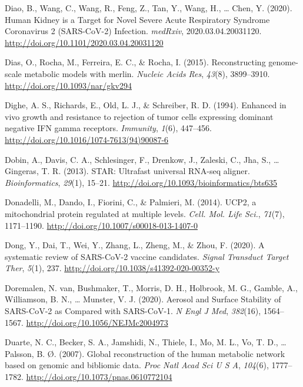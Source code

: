 \documentclass[12pt,twoside,openany,\mydriver]{thesis}  %
\begin{document}
\leavevmode\hypertarget{ref-diao_human_2020}{}%
Diao, B., Wang, C., Wang, R., Feng, Z., Tan, Y., Wang, H., \ldots{} Chen, Y. (2020). Human Kidney is a Target for Novel Severe Acute Respiratory Syndrome Coronavirus 2 (SARS-CoV-2) Infection. \emph{medRxiv}, 2020.03.04.20031120. \url{http://doi.org/10.1101/2020.03.04.20031120}

\leavevmode\hypertarget{ref-dias_reconstructing_2015}{}%
Dias, O., Rocha, M., Ferreira, E. C., \& Rocha, I. (2015). Reconstructing genome-scale metabolic models with merlin. \emph{Nucleic Acids Res}, \emph{43}(8), 3899--3910. \url{http://doi.org/10.1093/nar/gkv294}

\leavevmode\hypertarget{ref-dighe_enhanced_1994}{}%
Dighe, A. S., Richards, E., Old, L. J., \& Schreiber, R. D. (1994). Enhanced in vivo growth and resistance to rejection of tumor cells expressing dominant negative IFN gamma receptors. \emph{Immunity}, \emph{1}(6), 447--456. \url{http://doi.org/10.1016/1074-7613(94)90087-6}

\leavevmode\hypertarget{ref-dobin_star_2013}{}%
Dobin, A., Davis, C. A., Schlesinger, F., Drenkow, J., Zaleski, C., Jha, S., \ldots{} Gingeras, T. R. (2013). STAR: Ultrafast universal RNA-seq aligner. \emph{Bioinformatics}, \emph{29}(1), 15--21. \url{http://doi.org/10.1093/bioinformatics/bts635}

\leavevmode\hypertarget{ref-donadelli_ucp2_2014}{}%
Donadelli, M., Dando, I., Fiorini, C., \& Palmieri, M. (2014). UCP2, a mitochondrial protein regulated at multiple levels. \emph{Cell. Mol. Life Sci.}, \emph{71}(7), 1171--1190. \url{http://doi.org/10.1007/s00018-013-1407-0}

\leavevmode\hypertarget{ref-dong_systematic_2020}{}%
Dong, Y., Dai, T., Wei, Y., Zhang, L., Zheng, M., \& Zhou, F. (2020). A systematic review of SARS-CoV-2 vaccine candidates. \emph{Signal Transduct Target Ther}, \emph{5}(1), 237. \url{http://doi.org/10.1038/s41392-020-00352-y}

\leavevmode\hypertarget{ref-van_doremalen_aerosol_2020}{}%
Doremalen, N. van, Bushmaker, T., Morris, D. H., Holbrook, M. G., Gamble, A., Williamson, B. N., \ldots{} Munster, V. J. (2020). Aerosol and Surface Stability of SARS-CoV-2 as Compared with SARS-CoV-1. \emph{N Engl J Med}, \emph{382}(16), 1564--1567. \url{http://doi.org/10.1056/NEJMc2004973}

\leavevmode\hypertarget{ref-duarte_global_2007}{}%
Duarte, N. C., Becker, S. A., Jamshidi, N., Thiele, I., Mo, M. L., Vo, T. D., \ldots{} Palsson, B. Ø. (2007). Global reconstruction of the human metabolic network based on genomic and bibliomic data. \emph{Proc Natl Acad Sci U S A}, \emph{104}(6), 1777--1782. \url{http://doi.org/10.1073/pnas.0610772104}
\end{document}
